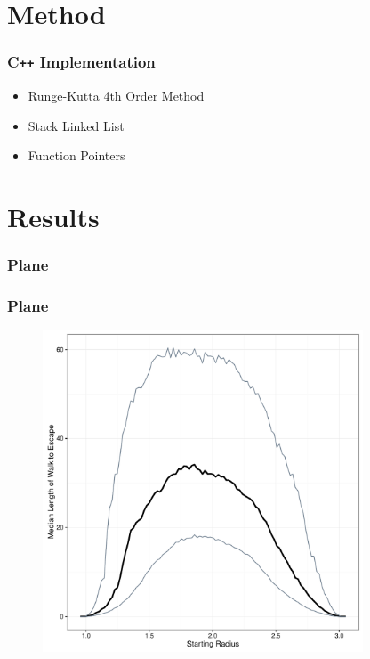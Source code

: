 \documentclass{beamer}
\begin{document}
\section{Method}

\begin{frame}
	
	\frametitle{C\texttt{++} Implementation}
	
	\begin{itemize}
		\item Runge-Kutta 4th Order Method
		\item Stack Linked List
		\item Function Pointers
	\end{itemize}
	
\end{frame}

\section{Results}


\begin{frame}
	
	\frametitle{Plane}
	
	\begin{figure}
		
	\end{figure}
	
\end{frame}

\begin{frame}

	\frametitle{Plane}
	
	\begin{figure}
		\includegraphics[width=0.85\textwidth]{images/PlaneIn1Out3.pdf}
	\end{figure}

\end{frame}
\end{document}
